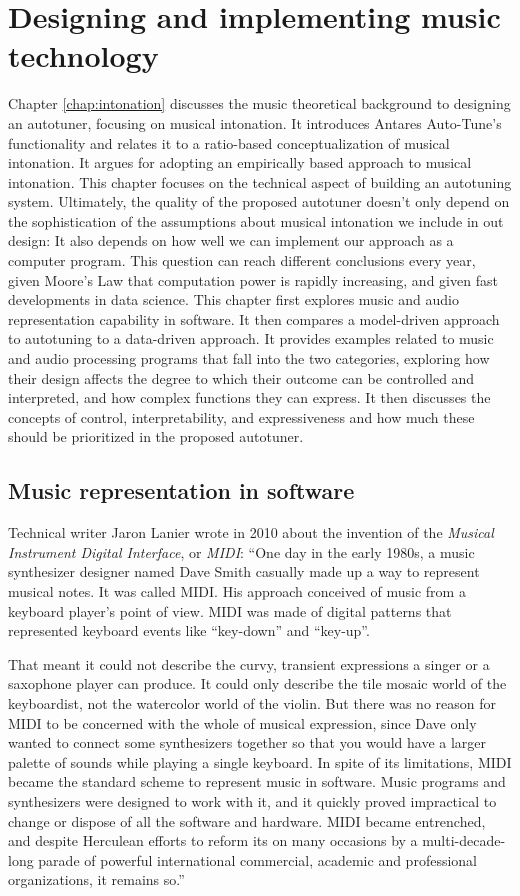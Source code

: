 \chapter{Designing and implementing music technology}
\label{chap:tech-background}
Chapter \ref{chap:intonation} discusses the music theoretical background to designing an autotuner, focusing on musical intonation. It introduces Antares Auto-Tune's functionality and relates it to a ratio-based conceptualization of musical intonation. It argues for adopting an empirically based approach to musical intonation. This chapter focuses on the technical aspect of building an autotuning system. Ultimately, the quality of the proposed autotuner doesn't only depend on the sophistication of the assumptions about musical intonation we include in out design: It also depends on how well we can implement our approach as a computer program. This question can reach different conclusions every year, given Moore's Law that computation power is rapidly increasing, and given fast developments in data science. This chapter first explores music and audio representation capability in software. It then compares a model-driven approach to autotuning to a data-driven approach. It provides examples related to music and audio processing programs that fall into the two categories, exploring how their design affects the degree to which their outcome can be controlled and interpreted, and how complex functions they can express. It then discusses the concepts of control, interpretability, and expressiveness and how much these should be prioritized in the proposed autotuner. 

\section{Music representation in software}
Technical writer Jaron Lanier wrote in 2010 about the invention of the \textit{Musical Instrument Digital Interface}, or \textit{MIDI}: ``One day in the early 1980s, a music synthesizer designer named Dave Smith casually made up a way to represent musical notes. It was called MIDI. His approach conceived of music from a keyboard player's point of view. MIDI was made of digital patterns that represented keyboard events like ``key-down'' and ``key-up''. 

That meant it could not describe the curvy, transient expressions a singer or a saxophone player can produce. It could only describe the tile mosaic world of the keyboardist, not the watercolor world of the violin. But there was no reason for MIDI to be concerned with the whole of musical expression, since Dave only wanted to connect some synthesizers together so that you would have a larger palette of sounds while playing a single keyboard. In spite of its limitations, MIDI became the standard scheme to represent music in software. Music programs and synthesizers were designed to work with it, and it quickly proved impractical to change or dispose of all the software and hardware. MIDI became entrenched, and despite Herculean efforts to reform its on many occasions by a multi-decade-long parade of powerful international commercial, academic and professional organizations, it remains so.'' \cite[p.~7]{lanier2010you}

